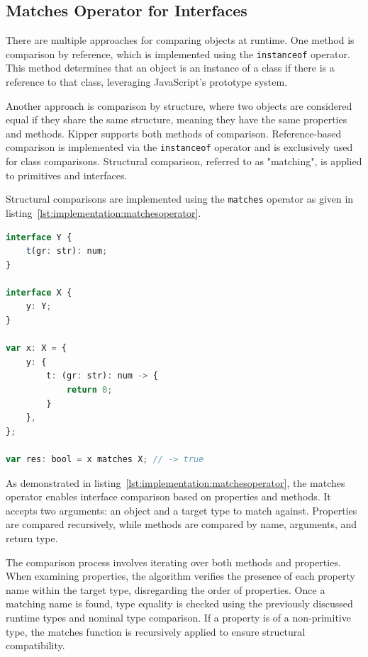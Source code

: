 \subsection{Matches Operator for Interfaces}
\label{subsec:matches}

There are multiple approaches for comparing objects at runtime. One method is comparison by reference, which is implemented using the \lstinline|instanceof| operator. This method determines that an object is an instance of a class if there is a reference to that class, leveraging JavaScript's prototype system.

Another approach is comparison by structure, where two objects are considered equal if they share the same structure, meaning they have the same properties and methods. Kipper supports both methods of comparison. Reference-based comparison is implemented via the \lstinline|instanceof| operator and is exclusively used for class comparisons. Structural comparison, referred to as "matching", is applied to primitives and interfaces. 

Structural comparisons are implemented using the \lstinline|matches| operator as given in listing~\ref{lst:implementation:matchesoperator}.

\begin{lstlisting}[language=Typescript,caption=The Kipper matches operator,label=lst:implementation:matchesoperator]
interface Y {
	t(gr: str): num;
}

interface X {
	y: Y;
}

var x: X = {
	y: {
		t: (gr: str): num -> {
			return 0;
		}
	},
};

var res: bool = x matches X; // -> true
\end{lstlisting}

As demonstrated in listing~\ref{lst:implementation:matchesoperator}, the matches operator enables interface comparison based on properties and methods. It accepts two arguments: an object and a target type to match against. Properties are compared recursively, while methods are compared by name, arguments, and return type.

The comparison process involves iterating over both methods and properties. When examining properties, the algorithm verifies the presence of each property name within the target type, disregarding the order of properties. Once a matching name is found, type equality is checked using the previously discussed runtime types and nominal type comparison. If a property is of a non-primitive type, the matches function is recursively applied to ensure structural compatibility.

